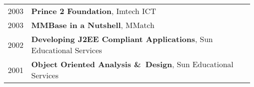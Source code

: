\documentclass[a4paper]{article}
\begin{document}
	\section*{}
	
		\begin{tabular}{l l}
			2003 & \textbf{Prince 2 Foundation}, Imtech ICT \\
			2003 & \textbf{MMBase in a Nutshell}, MMatch \\
			2002 & \textbf{Developing J2EE Compliant Applications},
			Sun Educational Services \\
			2001 & \textbf{Object Oriented Analysis \&\ Design}, 
			Sun Educational Services \\
		\end{tabular}


	\section*{}
	
\end{document}
